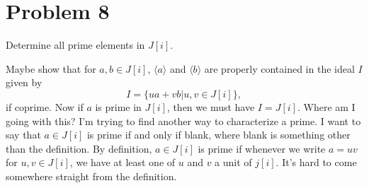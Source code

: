 \documentclass[12pt]{article}
\begin{document}
\section*{Problem 8}

Determine all prime elements in $J[i]$.

Maybe show that for $a,b\in J[i]$, $\langle a\rangle$ and $\langle b\rangle$ are properly contained
in the ideal $I$ given by
\begin{equation*}
I = \{ua+vb|u,v\in J[i]\},
\end{equation*}
if coprime.  Now if $a$ is prime in $J[i]$, then we must have $I=J[i]$.  Where am I going with this?
I'm trying to find another way to characterize a prime.  I want to say that $a\in J[i]$ is prime
if and only if blank, where blank is something other than the definition.  By definition, $a\in J[i]$
is prime if whenever we write $a=uv$ for $u,v\in J[i]$, we have at least one of $u$ and $v$ a unit of $j[i]$.
It's hard to come somewhere straight from the definition.
\end{document}
